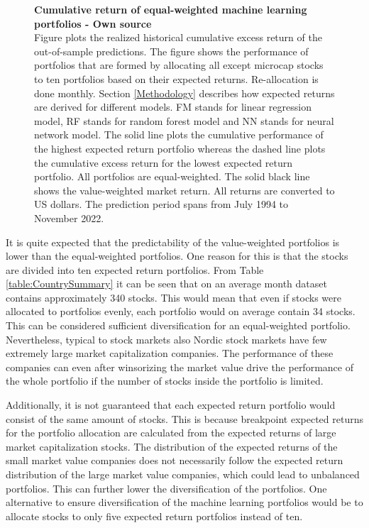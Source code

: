 \documentclass[12pt]{article}
\begin{document}
\begin{figure}[ht]
\centering
\caption[Cumulative return of equal-weighted machine learning portfolios]{\textbf{Cumulative return of equal-weighted machine learning portfolios \textnormal{- Own source}}\\ Figure plots the realized historical cumulative excess return of the out-of-sample predictions. The figure shows the performance of portfolios that are formed by allocating all except microcap stocks to ten portfolios based on their expected returns. Re-allocation is done monthly. Section \ref{Methodology} describes how expected returns are derived for different models. FM stands for linear regression model, RF stands for random forest model and NN stands for neural network model. The solid line plots the cumulative performance of the highest expected return portfolio whereas the dashed line plots the cumulative excess return for the lowest expected return portfolio. All portfolios are equal-weighted. The solid black line shows the value-weighted market return. All returns are converted to US dollars. The prediction period spans from July 1994 to November 2022.}

\label{plot:cumul_ew_portf_return}
\end{figure}

It is quite expected that the predictability of the value-weighted portfolios is lower than the equal-weighted portfolios. One reason for this is that the stocks are divided into ten expected return portfolios. From Table \ref{table:CountrySummary} it can be seen that on an average month dataset contains approximately 340 stocks. This would mean that even if stocks were allocated to portfolios evenly, each portfolio would on average contain 34 stocks. This can be considered sufficient diversification for an equal-weighted portfolio. Nevertheless, typical to stock markets also Nordic stock markets have few extremely large market capitalization companies. The performance of these companies can even after winsorizing the market value drive the performance of the whole portfolio if the number of stocks inside the portfolio is limited. \par

Additionally, it is not guaranteed that each expected return portfolio would consist of the same amount of stocks. This is because breakpoint expected returns for the portfolio allocation are calculated from the expected returns of large market capitalization stocks. The distribution of the expected returns of the small market value companies does not necessarily follow the expected return distribution of the large market value companies, which could lead to unbalanced portfolios. This can further lower the diversification of the portfolios. One alternative to ensure diversification of the machine learning portfolios would be to allocate stocks to only five expected return portfolios instead of ten. \par
\end{document}
